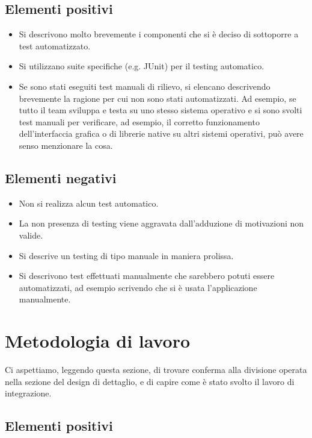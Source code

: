 \documentclass[a4paper,12pt]{report}
\begin{document}
\subsection*{Elementi positivi}

\begin{itemize}
 \item Si descrivono molto brevemente i componenti che si è deciso di sottoporre a test automatizzato.
 \item Si utilizzano suite specifiche (e.g. JUnit) per il testing automatico.
 \item Se sono stati eseguiti test manuali di rilievo, si elencano descrivendo brevemente la ragione per cui non sono stati automatizzati. Ad esempio, se tutto il team sviluppa e testa su uno stesso sistema operativo e si sono svolti test manuali per verificare, ad esempio, il corretto funzionamento dell'interfaccia grafica o di librerie native su altri sistemi operativi, può avere senso menzionare la cosa.
\end{itemize}

\subsection*{Elementi negativi}
\begin{itemize}
 \item Non si realizza alcun test automatico.
 \item La non presenza di testing viene aggravata dall'adduzione di motivazioni non valide.
 \item Si descrive un testing di tipo manuale in maniera prolissa.
 \item Si descrivono test effettuati manualmente che sarebbero potuti essere automatizzati, ad esempio scrivendo che si è usata l'applicazione manualmente.
\end{itemize}

\section{Metodologia di lavoro}

Ci aspettiamo, leggendo questa sezione, di trovare conferma alla divisione operata nella sezione del design di dettaglio, e di capire come è stato svolto il lavoro di integrazione.

\subsection*{Elementi positivi}
\end{document}
